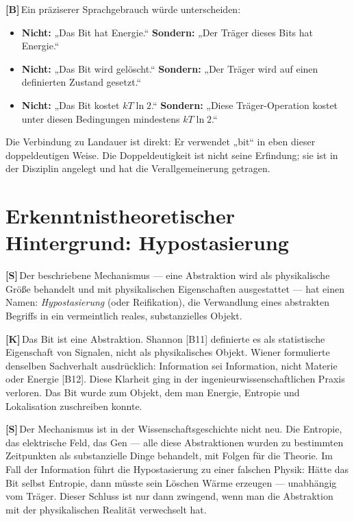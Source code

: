 \documentclass[11pt,a4paper]{article}
\newcommand{\LK}{\textcolor{layK}{\textbf{\footnotesize\textsf{[K]}}}\,}
\newcommand{\LB}{\textcolor{layB}{\textbf{\footnotesize\textsf{[B]}}}\,}
\newcommand{\LSk}{\textcolor{layS}{\textbf{\footnotesize\textsf{[S]}}}\,}
\theoremstyle{ffgft}
\begin{document}
\LB Ein präziserer Sprachgebrauch würde unterscheiden:

\begin{itemize}[leftmargin=1.4em,itemsep=0.25em]
  \item \textbf{Nicht:} „Das Bit hat Energie.“ \quad
        \textbf{Sondern:} „Der Träger dieses Bits hat Energie.“
  \item \textbf{Nicht:} „Das Bit wird gelöscht.“ \quad
        \textbf{Sondern:} „Der Träger wird auf einen definierten Zustand gesetzt.“
  \item \textbf{Nicht:} „Das Bit kostet $kT\ln 2$.“ \quad
        \textbf{Sondern:} „Diese Träger-Operation kostet unter diesen Bedingungen
        mindestens $kT\ln 2$.“
\end{itemize}

Die Verbindung zu Landauer ist direkt: Er verwendet „bit“ in eben dieser
doppeldeutigen Weise. Die Doppeldeutigkeit ist nicht seine Erfindung; sie ist in
der Disziplin angelegt und hat die Verallgemeinerung getragen.

\section{Erkenntnistheoretischer Hintergrund: Hypostasierung}

\LSk Der beschriebene Mechanismus --- eine Abstraktion wird als physikalische
Größe behandelt und mit physikalischen Eigenschaften ausgestattet --- hat einen
Namen: \emph{Hypostasierung} (oder Reifikation), die Verwandlung eines abstrakten
Begriffs in ein vermeintlich reales, substanzielles Objekt.

\LK Das Bit ist eine Abstraktion. Shannon [B11] definierte es als statistische
Eigenschaft von Signalen, nicht als physikalisches Objekt. Wiener formulierte
denselben Sachverhalt ausdrücklich: Information sei Information, nicht Materie
oder Energie [B12]. Diese Klarheit ging in der ingenieurwissenschaftlichen Praxis
verloren. Das Bit wurde zum Objekt, dem man Energie, Entropie und Lokalisation
zuschreiben konnte.

\LSk Der Mechanismus ist in der Wissenschaftsgeschichte nicht neu. Die Entropie,
das elektrische Feld, das Gen --- alle diese Abstraktionen wurden zu bestimmten
Zeitpunkten als substanzielle Dinge behandelt, mit Folgen für die Theorie. Im Fall
der Information führt die Hypostasierung zu einer falschen Physik: Hätte das Bit
selbst Entropie, dann müsste sein Löschen Wärme erzeugen --- unabhängig vom
Träger. Dieser Schluss ist nur dann zwingend, wenn man die Abstraktion mit der
physikalischen Realität verwechselt hat.
\end{document}
